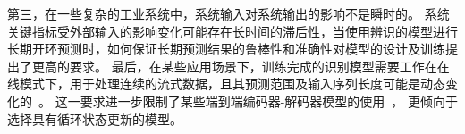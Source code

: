 第三，在一些复杂的工业系统中，系统输入对系统输出的影响不是瞬时的。
系统关键指标受外部输入的影响变化可能存在长时间的滞后性，当使用辨识的模型进行长期开环预测时，如何保证长期预测结果的鲁棒性和准确性对模型的设计及训练提出了更高的要求。
最后，在某些应用场景下，训练完成的识别模型需要工作在在线模式下，用于处理连续的流式数据，且其预测范围及输入序列长度可能是动态变化的~\cite{VSDN_Liu2020}。
这一要求进一步限制了某些端到端编码器-解码器模型的使用~\cite{Rubanova2019,Yildiz2019}，
更倾向于选择具有循环状态更新的模型。


